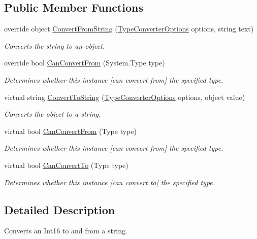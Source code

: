 \subsection*{Public Member Functions}
\begin{DoxyCompactItemize}
\item 
override object \hyperlink{a00094_aff576c6ca9bb1942fb17e385befb0197}{Convert\-From\-String} (\hyperlink{a00152}{Type\-Converter\-Options} options, string text)
\begin{DoxyCompactList}\small\item\em Converts the string to an object. \end{DoxyCompactList}\item 
override bool \hyperlink{a00094_a4040b7e66af082f1a57b65c20877dd7f}{Can\-Convert\-From} (System.\-Type type)
\begin{DoxyCompactList}\small\item\em Determines whether this instance \mbox{[}can convert from\mbox{]} the specified type. \end{DoxyCompactList}\item 
virtual string \hyperlink{a00066_a36cb2f9b24f15a671293f3a722324c27}{Convert\-To\-String} (\hyperlink{a00152}{Type\-Converter\-Options} options, object value)
\begin{DoxyCompactList}\small\item\em Converts the object to a string. \end{DoxyCompactList}\item 
virtual bool \hyperlink{a00066_a470d21adaa704eb281250dbd112ff91a}{Can\-Convert\-From} (Type type)
\begin{DoxyCompactList}\small\item\em Determines whether this instance \mbox{[}can convert from\mbox{]} the specified type. \end{DoxyCompactList}\item 
virtual bool \hyperlink{a00066_acb65bd8c8199d88d5b1629ae35d18514}{Can\-Convert\-To} (Type type)
\begin{DoxyCompactList}\small\item\em Determines whether this instance \mbox{[}can convert to\mbox{]} the specified type. \end{DoxyCompactList}\end{DoxyCompactItemize}


\subsection{Detailed Description}
Converts an Int16 to and from a string. 



